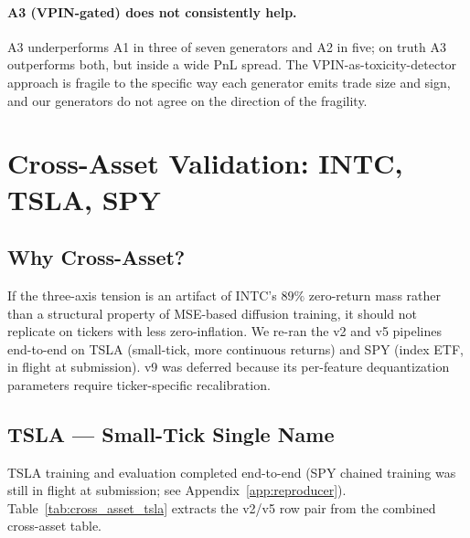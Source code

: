 \documentclass[journal]{IEEEtran}
\theoremstyle{definition}   %
\begin{document}
\paragraph{A3 (VPIN-gated) does not consistently help.} A3
underperforms A1 in three of seven generators and A2 in five; on
truth A3 outperforms both, but inside a wide PnL spread. The
VPIN-as-toxicity-detector approach is fragile to the specific way
each generator emits trade size and sign, and our generators do
not agree on the direction of the fragility.

\section{Cross-Asset Validation: INTC, TSLA, SPY}
\label{sec:cross_asset}

\subsection{Why Cross-Asset?}
\label{sec:why_cross}

If the three-axis tension is an artifact of INTC's $89\%$
zero-return mass rather than a structural property of MSE-based
diffusion training, it should not replicate on tickers with less
zero-inflation. We re-ran the v2 and v5 pipelines end-to-end on
TSLA (small-tick, more continuous returns) and SPY (index ETF, in
flight at submission). v9 was deferred because its per-feature
dequantization parameters require ticker-specific recalibration.

\subsection{TSLA --- Small-Tick Single Name}
\label{sec:tsla}

TSLA training and evaluation completed end-to-end (SPY chained
training was still in flight at submission; see
Appendix~\ref{app:reproducer}).
Table~\ref{tab:cross_asset_tsla} extracts the v2/v5 row pair from the
combined cross-asset table.
\end{document}

